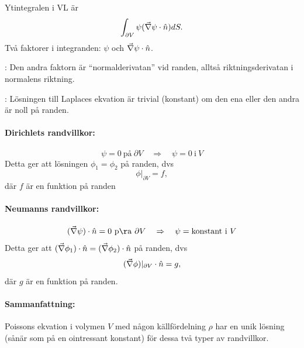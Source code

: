 \documentclass[%
oneside,                 %
final,                   %
10pt]{article}
\newcommand{\shortinlinecomment}[3]{{\color{red}{\bf #1}: #2}}
\begin{document}
\noindent
Ytintegralen i VL är 
$$
\int_{\partial V}\psi(\vec{\nabla}\psi\cdot\hat n)dS.
$$ 
Två faktorer i integranden: $\psi$ och $\vec{\nabla}\psi\cdot\hat n$. 

\shortinlinecomment{Kommentar 4}{ Den andra faktorn är ``normalderivatan'' vid randen, alltså riktningsderivatan i normalens riktning. }{ Den andra faktorn är }

\shortinlinecomment{Kommentar 5}{ Lösningen till Laplaces ekvation är trivial (konstant) om den ena eller den andra är noll på randen. }{ Lösningen till Laplaces ekvation }

\paragraph{Dirichlets randvillkor:}
$$
\psi = 0 \mathrm{~på~} \partial V \quad \Rightarrow \quad \psi = 0 \mathrm{~i~} V
$$
Detta ger att lösningen $\phi_1 = \phi_2$ på randen, dvs
$$
\phi|_{\partial V}=f,
$$
där $f$ är en funktion på randen

\paragraph{Neumanns randvillkor:}
$$
(\vnabla\psi) \cdot \hat n=0 \mathrm{~på~} \partial V \quad \Rightarrow \quad \psi = \mathrm{konstant} \mathrm{~i~} V
$$
Detta ger att $(\vec{\nabla}\phi_1) \cdot \hat n=(\vec{\nabla}\phi_2) \cdot \hat n$ på randen, dvs
$$
(\vec{\nabla}\phi)|_{\partial V}\cdot\hat n=g,
$$
där $g$ är en funktion på randen. 

\paragraph{Sammanfattning:}
Poissons ekvation i volymen $V$ med någon källfördelning $\rho$ har en unik lösning (sånär
som på en ointressant konstant) för dessa två typer av randvillkor.


\end{document}
